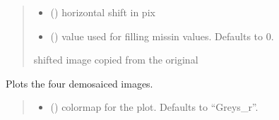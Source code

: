 \documentclass[letterpaper,10pt,english]{sphinxmanual}
\begin{document}
\begin{fulllineitems}
\begin{fulllineitems}
\begin{quote}
\begin{description}
\begin{itemize}
\item {} 
\sphinxAtStartPar
{} () \textendash{} horizontal shift in pix

\item {} 
\sphinxAtStartPar
{} (\sphinxstyleliteralemphasis{\sphinxupquote{, }}) \textendash{} value used for filling missin values. Defaults to 0.

\end{itemize}

\sphinxAtStartPar
shifted image copied from the original

\sphinxAtStartPar
{\hyperref[\detokenize{micropolarray:micropolarray.micropol_image.MicropolImage}]{}}

\end{description}\end{quote}

\end{fulllineitems}


\begin{fulllineitems}
\label{\detokenize{micropolarray:micropolarray.micropol_image.MicropolImage.show_demo_images}}
\pysigstartsignatures
{}
\pysigstopsignatures
\sphinxAtStartPar
Plots the four demosaiced images.
\begin{quote}\begin{description}
\begin{itemize}
\item {} 
\sphinxAtStartPar
{} (\sphinxstyleliteralemphasis{\sphinxupquote{, }}) \textendash{} colormap for the plot. Defaults to “Greys\_r”.


\end{itemize}
\end{description}
\end{quote}
\end{fulllineitems}
\end{fulllineitems}
\end{document}
